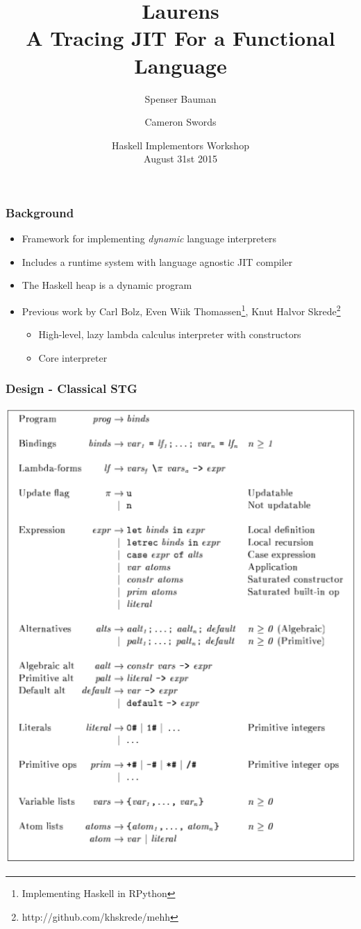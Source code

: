 \documentclass[xetex,serif,mathserif]{beamer}
\title{Laurens \\ {\normalsize A Tracing JIT For a Functional Language} }
\author[shortname]{Spenser Bauman \and Cameron Swords}
\institute[shortinst]{
    Indiana University Bloomington, USA
}
\date{Haskell Implementors Workshop \\ August 31st 2015}
\newenvironment{slide}[1]{\begin{frame}\frametitle{#1}}{\end{frame}}
\begin{document}
\frame{\titlepage}

\begin{slide}{Background}
  \begin{itemize}
    \item Framework for implementing \emph{dynamic} language interpreters
    \item Includes a runtime system with language agnostic JIT compiler
    \item The Haskell heap is a dynamic program
    \item Previous work by Carl Bolz, 
          Even Wiik Thomassen\footnote{Implementing Haskell in RPython},
         Knut Halvor Skrede\footnote{http://github.com/khskrede/mehh}
      \begin{itemize}
        \item High-level, lazy lambda calculus interpreter with constructors
        \item Core interpreter
      \end{itemize}
  \end{itemize}
\end{slide}

\begin{slide}{Design - Classical STG}
  \begin{center}
  \includegraphics[scale=0.3]{stg-def}
  \end{center}
\end{slide}
\end{document}
